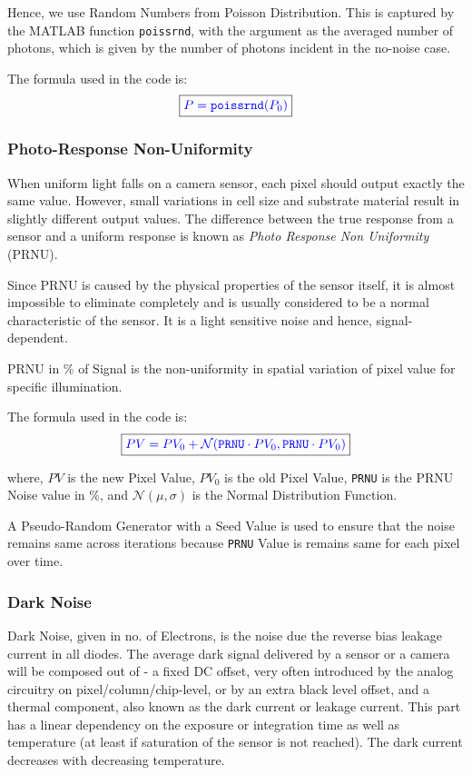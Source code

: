 \documentclass[../../main.tex]{subfiles}
\begin{document}
Hence, we use Random Numbers from Poisson Distribution. This is captured by the MATLAB function \texttt{poissrnd}, with the argument as the averaged number of photons, which is given by the number of photons incident in the no-noise case. 

The formula used in the code is:
\begin{equation}
    \boxed{ \color{blue} P = \texttt{poissrnd}(P_0) \color{black}}
\end{equation}

\newpage
\subsubsection{Photo-Response Non-Uniformity} %
When uniform light falls on a camera sensor, each pixel should output exactly the same value. However, small variations in cell size and substrate material result in slightly different output values. The difference between the true response from a sensor and a uniform response is known as \emph{Photo Response Non Uniformity} (PRNU).

Since PRNU is caused by the physical properties of the sensor itself, it is almost impossible to eliminate completely and is usually considered to be a normal characteristic of the sensor. It is a light sensitive noise and hence, signal-dependent.

PRNU in \% of Signal is the non-uniformity in spatial variation of pixel value for specific illumination.

The formula used in the code is:
\begin{equation}
    \boxed{ \color{blue} PV = PV_0 + \mathcal{N}(\texttt{PRNU} \cdot PV_0, \texttt{PRNU} \cdot PV_0)   \color{black}}
\end{equation}

where, $PV$ is the new Pixel Value, $PV_0$ is the old Pixel Value, \texttt{PRNU} is the PRNU Noise value in \%, and $\mathcal{N}(\mu, \sigma)$ is the Normal Distribution Function.

A Pseudo-Random Generator with a Seed Value is used to ensure that the noise remains same across iterations because \texttt{PRNU} Value is remains same for each pixel over time. 


\subsubsection{Dark Noise} %
Dark Noise, given in no. of Electrons, is the noise due the reverse bias leakage current in all diodes. The average dark signal delivered by a sensor or a camera will be composed out of - a fixed DC offset, very often introduced by the analog circuitry on pixel/column/chip-level, or by an
extra black level offset, and a thermal component, also known as the dark current or leakage current. This part has a linear dependency on the exposure or integration time as well as temperature (at least if saturation of the sensor is not reached). The dark current decreases with decreasing temperature.
\end{document}
